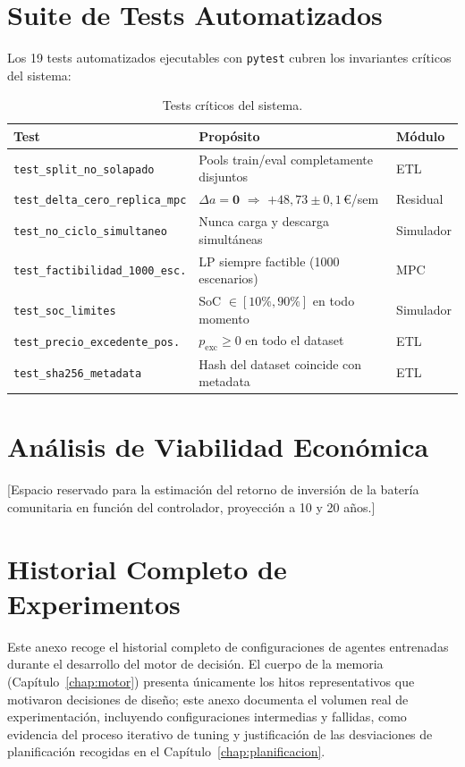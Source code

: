 \documentclass[12pt, a4paper, twoside]{report}
\begin{document}
\chapter{Suite de Tests Automatizados}
\label{app:tests}

Los 19 tests automatizados ejecutables con \texttt{pytest} cubren los
invariantes críticos del sistema:

\begin{table}[H]
\centering
\caption{Tests críticos del sistema.}
\label{tab:tests}
\begin{tabularx}{\textwidth}{lXl}
\toprule
\textbf{Test} & \textbf{Propósito} & \textbf{Módulo} \\
\midrule
\texttt{test\_split\_no\_solapado} & Pools train/eval completamente disjuntos & ETL \\
\texttt{test\_delta\_cero\_replica\_mpc} & $\Delta a=\mathbf{0}$ $\Rightarrow$ $+48{,}73\pm0{,}1$\,€/sem & Residual \\
\texttt{test\_no\_ciclo\_simultaneo} & Nunca carga y descarga simultáneas & Simulador \\
\texttt{test\_factibilidad\_1000\_esc.} & LP siempre factible (1000 escenarios) & MPC \\
\texttt{test\_soc\_limites} & SoC $\in [10\%, 90\%]$ en todo momento & Simulador \\
\texttt{test\_precio\_excedente\_pos.} & $p_{\text{exc}} \geq 0$ en todo el dataset & ETL \\
\texttt{test\_sha256\_metadata} & Hash del dataset coincide con metadata & ETL \\
\bottomrule
\end{tabularx}
\end{table}

\chapter{Análisis de Viabilidad Económica}
\label{app:viabilidad}
[Espacio reservado para la estimación del retorno de inversión de la batería
comunitaria en función del controlador, proyección a 10 y 20 años.]

\chapter{Historial Completo de Experimentos}
\label{app:historial}

Este anexo recoge el historial completo de configuraciones de agentes
entrenadas durante el desarrollo del motor de decisión. El cuerpo de la memoria
(Capítulo~\ref{chap:motor}) presenta únicamente los hitos representativos que
motivaron decisiones de diseño; este anexo documenta el volumen real de
experimentación, incluyendo configuraciones intermedias y fallidas, como
evidencia del proceso iterativo de tuning y justificación de las desviaciones
de planificación recogidas en el Capítulo~\ref{chap:planificacion}.
\end{document}
